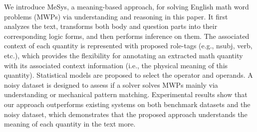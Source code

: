 We introduce MeSys, a meaning-based approach, for solving English math word problems (MWPs) via understanding and reasoning in this paper. It first analyzes the text, transforms both body and question parts into their corresponding logic forms, and then performs inference on them. The associated context of each quantity is represented with proposed role-tags (e.g., nsubj, verb, etc.), which provides the flexibility for annotating an extracted math quantity with its associated context information (i.e., the physical meaning of this quantity). Statistical models are proposed to select the operator and operands. A noisy dataset is designed to assess if a solver solves MWPs mainly via understanding or mechanical pattern matching. Experimental results show that our approach outperforms existing systems on both benchmark datasets and the noisy dataset, which demonstrates that the proposed approach understands the meaning of each quantity in the text more.
